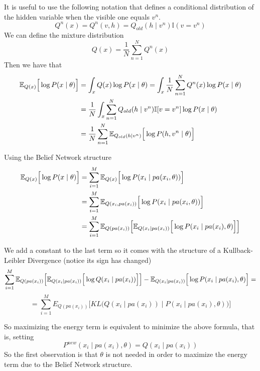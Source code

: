 It is useful to use the following notation that defines a conditional distribution of the hidden variable when the visible one equals \(v^{n}\).
\[
  Q^{n}(x) = Q^{n}(v,h) = Q_{old}(h \mid v^{n}) \mathbb{I}(v = v^{n})
\]
We can define the mixture distribution
\[
  Q(x) = \frac{1}{N}\sum_{n = 1}^{N}Q^{n}(x)
\]
Then we have that
\[
  \begin{aligned}
    \E{Q(x)}{\log{P(x \mid \theta)}} &= \int_{x}Q(x)\log{P(x \mid \theta)} =  \int_{x} \frac{1}{N}\sum_{n=1}^{N}Q^{n}(x)\log{P(x \mid \theta)} \\
    &= \frac{1}{N} \int_{x}\sum_{n=1}^{N}Q_{old}(h \mid v^{n})\mathbb{I}[v = v^{n}]\log{P(x \mid \theta)}\\
    &= \frac{1}{N}\sum_{n = 1}^{N}\E{Q_{old}(h \mid v^{n})} {\log{P(h, v^{n} \mid \theta)}}
  \end{aligned}
  \vadjust{\todo{Deberia salir $P(x^{n} \mid \theta)$ pero no me sale}}
\]

Using the Belief Network structure
\[
  \begin{aligned}
    \mathbb{E}_{Q(x)}\Big[\log{P(x \mid \theta)}\Big] &= \sum_{i = 1}^{M}\mathbb{E}_{Q(x)}\Big[\log{P(x_{i} \mid pa(x_{i}, \theta))}\Big]\\
    &= \sum_{i = 1}^{M}\mathbb{E}_{Q(x_{i}, pa(x_{i}))}\Big[\log{P(x_{i} \mid pa(x_{i}, \theta))}\Big]\\
    &= \sum_{i = 1}^{M}\mathbb{E}_{Q(pa(x_{i}))}\Big[ \mathbb{E}_{Q(x_{i}\mid pa(x_{i}))}\Big[ \log{P(x_{i} \mid pa(x_{i}), \theta)}\Big]\Big]
\end{aligned}
\]

We add a constant to the last term so it comes with the structure of a Kullback-Leibler Divergence (notice its sign has changed)
\[
  \sum_{i = 1}^{M}\mathbb{E}_{Q(pa(x_{i}))}\Big[\mathbb{E}_{Q(x_{i}\mid pa(x_{i}))}\Big[\log{Q(x_{i} \mid pa(x_{i}))}\Big]\Big] - \mathbb{E}_{Q(x_{i}\mid pa(x_{i}))}\Big[\log{P(x_{i} \mid pa(x_{i}), \theta)}\Big]=
\]
\[
  = \sum_{i = 1}^{M} E_{Q(pa(x_{i}))} \Big[KL \Big( Q(x_{i}\mid pa(x_{i})) \mid P(x_{i} \mid pa(x_{i}), \theta) \Big) \Big]
\]

So maximizing the energy term is equivalent to minimize the above formula, that is, setting
\[
  P^{new}(x_{i} \mid pa(x_{i}), \theta) = Q(x_{i} \mid pa(x_{i}))
\]
So the first observation is that \(\theta\) is not needed in order to maximize the energy term due to the Belief Network structure.

\begin{exampleth}

\end{exampleth}



